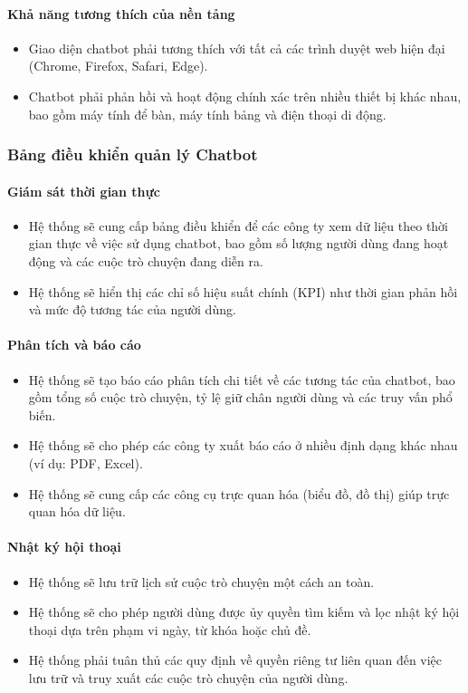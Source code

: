 \paragraph{Khả năng tương thích của nền tảng}
\begin{itemize}
    \item Giao diện chatbot phải tương thích với tất cả các trình duyệt web hiện đại (Chrome, Firefox, Safari, Edge).
    \item Chatbot phải phản hồi và hoạt động chính xác trên nhiều thiết bị khác nhau, bao gồm máy tính để bàn, máy tính bảng và điện thoại di động.
\end{itemize}

\subsubsection{Bảng điều khiển quản lý Chatbot}

\paragraph{Giám sát thời gian thực}
\begin{itemize}
    \item Hệ thống sẽ cung cấp bảng điều khiển để các công ty xem dữ liệu theo thời gian thực về việc sử dụng chatbot, bao gồm số lượng người dùng đang hoạt động và các cuộc trò chuyện đang diễn ra.
    \item Hệ thống sẽ hiển thị các chỉ số hiệu suất chính (KPI) như thời gian phản hồi và mức độ tương tác của người dùng.
\end{itemize}

\paragraph{Phân tích và báo cáo}
\begin{itemize}
    \item Hệ thống sẽ tạo báo cáo phân tích chi tiết về các tương tác của chatbot, bao gồm tổng số cuộc trò chuyện, tỷ lệ giữ chân người dùng và các truy vấn phổ biến.
    \item Hệ thống sẽ cho phép các công ty xuất báo cáo ở nhiều định dạng khác nhau (ví dụ: PDF, Excel).
    \item Hệ thống sẽ cung cấp các công cụ trực quan hóa (biểu đồ, đồ thị) giúp trực quan hóa dữ liệu.
\end{itemize}

\paragraph{Nhật ký hội thoại}
\begin{itemize}
    \item Hệ thống sẽ lưu trữ lịch sử cuộc trò chuyện một cách an toàn.
    \item Hệ thống sẽ cho phép người dùng được ủy quyền tìm kiếm và lọc nhật ký hội thoại dựa trên phạm vi ngày, từ khóa hoặc chủ đề.
    \item Hệ thống phải tuân thủ các quy định về quyền riêng tư liên quan đến việc lưu trữ và truy xuất các cuộc trò chuyện của người dùng.
\end{itemize}

